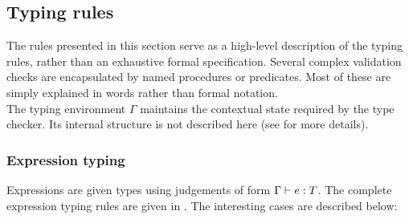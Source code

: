 \subsection{Typing rules}
The rules presented in this section serve as a high-level description of the typing rules, rather than an exhaustive formal specification. Several complex validation checks are encapsulated by named procedures or predicates. Most of these are simply explained in words rather than formal notation.\\
The typing environment $\Gamma$ maintains the contextual state required by the type checker. Its internal structure is not described here (see  for more details).
\subsubsection{Expression typing} \label{sec:implementation_expression_typing}
Expressions are given types using judgements of form $\Gamma \vdash e : T$. The complete expression typing rules are given in . The interesting cases are described below:
